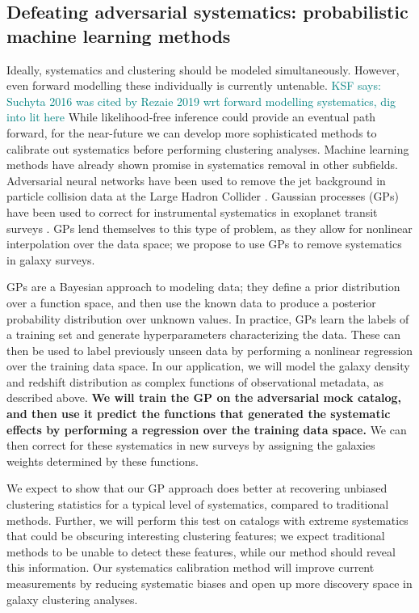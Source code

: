 \documentclass[12pt, fullpage, letterpaper]{article}
\newcommand{\KSF}[1]{\textcolor{teal}{KSF says: #1}}
\begin{document}
\subsection{Defeating adversarial systematics: probabilistic machine learning methods}

Ideally, systematics and clustering should be modeled simultaneously. 
However, even forward modelling these individually is currently untenable. \KSF{Suchyta 2016 was cited by Rezaie 2019 wrt forward modelling systematics, dig into lit here} 
While likelihood-free inference could provide an eventual path forward, for the near-future we can develop more sophisticated methods to calibrate out systematics before performing clustering analyses.
Machine learning methods have already shown promise in systematics removal in other subfields.
Adversarial neural networks have been used to remove the jet background in particle collision data at the Large Hadron Collider \citep{Shimmin2017}.
Gaussian processes (GPs) have been used to correct for instrumental systematics in exoplanet transit surveys \citep{Gibson2012, Aigrain2016}. 
GPs lend themselves to this type of problem, as they allow for nonlinear interpolation over the data space; we propose to use GPs to remove systematics in galaxy surveys.

GPs are a Bayesian approach to modeling data; they define a prior distribution over a function space, and then use the known data to produce a posterior probability distribution over unknown values. 
In practice, GPs learn the labels of a training set and generate hyperparameters characterizing the data.
These can then be used to label previously unseen data by performing a nonlinear regression over the training data space.
In our application, we will model the galaxy density and redshift distribution as complex functions of observational metadata, as described above.
\textbf{We will train the GP on the adversarial mock catalog, and then use it predict the functions that generated the systematic effects by performing a regression over the training data space.}
We can then correct for these systematics in new surveys by assigning the galaxies weights determined by these functions.

We expect to show that our GP approach does better at recovering unbiased clustering statistics for a typical level of systematics, compared to traditional methods.
Further, we will perform this test on catalogs with extreme systematics that could be obscuring interesting clustering features; we expect traditional methods to be unable to detect these features, while our method should reveal this information.
Our systematics calibration method will improve current measurements by reducing systematic biases and open up more discovery space in galaxy clustering analyses.
\end{document}

